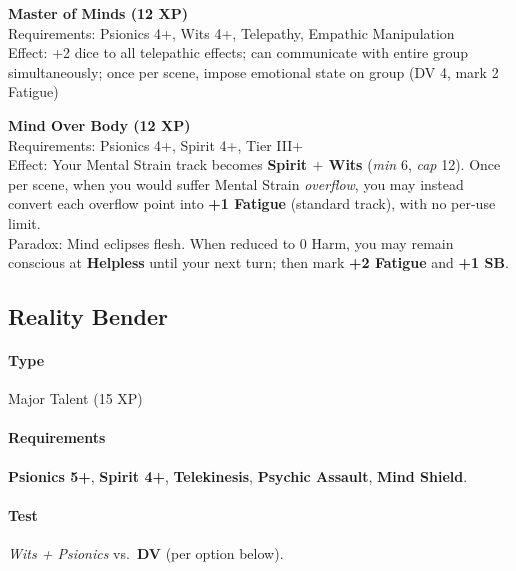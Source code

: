 \documentclass[11pt,twoside]{article}
\begin{document}
\textbf{Master of Minds (12 XP)} \\
Requirements: Psionics 4+, Wits 4+, Telepathy, Empathic Manipulation \\
Effect: +2 dice to all telepathic effects; can communicate with entire group simultaneously; once per scene, impose emotional state on group (DV 4, mark 2 Fatigue)

\textbf{Mind Over Body (12 XP)} \\
Requirements: Psionics 4+, Spirit 4+, Tier III+ \\[2pt]
Effect: Your Mental Strain track becomes \textbf{Spirit $+$ Wits} 
(\emph{min} 6, \emph{cap} 12). Once per scene, when you would suffer Mental Strain \emph{overflow}, you may instead convert each overflow point into \textbf{+1 Fatigue} (standard track), with no per-use limit. \\[2pt]
Paradox: Mind eclipses flesh. When reduced to 0 Harm, you may remain conscious at \textbf{Helpless} until your next turn; then mark \textbf{+2 Fatigue} and \textbf{+1 SB}. \\[2pt]

\subsection*{Reality Bender}
\label{talent:reality-bender}

\paragraph*{Type} Major Talent (15 XP)

\paragraph*{Requirements} \textbf{Psionics 5+}, \textbf{Spirit 4+}, \textbf{Telekinesis}, \textbf{Psychic Assault}, \textbf{Mind Shield}.

\paragraph*{Test} \emph{Wits + Psionics} vs.\ \textbf{DV} (per option below).
\end{document}
